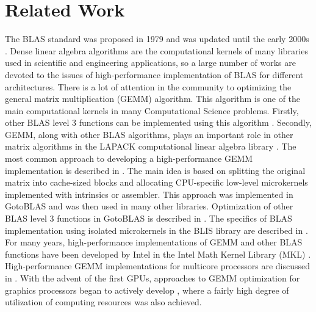 \section{Related Work}
\label{sec2}

The BLAS standard was proposed in 1979 \cite{c27} and was updated until the early 2000s
\cite{c28,c29}. Dense linear algebra algorithms are the computational kernels of many libraries used in scientific and engineering applications, so a large number of works are devoted to the issues of high-performance implementation of BLAS for different architectures. There is a lot of attention in the community to optimizing the general matrix multiplication (GEMM) algorithm. This algorithm is one of the main computational kernels in many Computational Science problems. Firstly, other BLAS level 3 functions can be implemented using this algorithm \cite{c48}. Secondly, GEMM, along with other BLAS algorithms, plays an important role in other matrix algorithms in the LAPACK computational linear algebra library \cite{c65}. The most common approach to developing a high-performance GEMM implementation is described in \cite{c46}. The main idea is based on splitting the original matrix into cache-sized blocks and allocating CPU-specific low-level microkernels implemented with intrinsics or assembler. This approach was implemented in GotoBLAS and was then used in many other libraries. Optimization of other BLAS level 3 functions in GotoBLAS is described in \cite{c47}. The specifics of BLAS implementation using isolated microkernels in the BLIS library are described in \cite{c62}. For many years, high-performance implementations of GEMM and other BLAS functions have been developed by Intel in the Intel Math Kernel Library (MKL) \cite{c66}. High-performance GEMM implementations for multicore processors are discussed in \cite{c49}. With the advent of the first GPUs, approaches to GEMM optimization for graphics processors began to actively develop \cite{c51,c52}, where a fairly high degree of utilization of computing resources was also achieved. 

